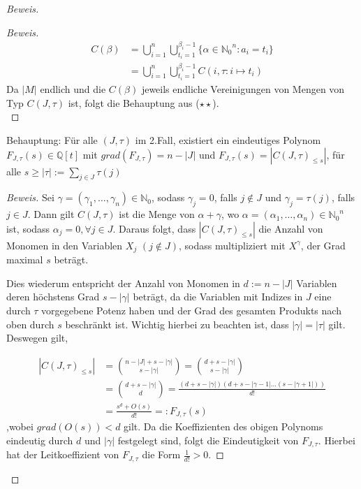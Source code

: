 \documentclass{article}
\newcommand*{\indx}[2]{{#1}_{#2}}
\newcommand*{\potx}[2]{{#1}^{#2}}
\newcommand*{\N}{\mathbb{N}_0}
\begin{document}
\begin{proof}[Beweis]
\begin{compactenum}
\begin{proof}[Beweis]
 	\begin{align*}
 	C(\beta)&=\bigcup\limits_{i=1}^{n}\bigcup\limits_{t_{i}=1}^{\indx{\beta}{i}-1}\{\alpha\in \potx{\N}{n}:\indx{a}{i}=\indx{t}{i}\}\\&
 	=\bigcup\limits_{i=1}^{n}\bigcup\limits_{t_{i}=1}^{\indx{\beta}{i}-1} C({i},\tau:i\mapsto \indx{t}{i})
 	\end{align*}
 	Da $\left|M\right|$ endlich und die $C(\beta)$ jeweils endliche Vereinigungen von Mengen von Typ $C(J,\tau)$ ist, folgt die Behauptung aus ($\star \star$).\\
\end{proof}
\item Behauptung: Für alle $(J,\tau)$ im 2.Fall, existiert ein eindeutiges Polynom $\indx{F}{J,\tau}(s)\in \mathbb{Q}[t]$ mit $grad(\indx{F}{J,\tau})=n-|J|$ und
$\indx{F}{J,\tau}(s)=\left|\indx{C(J,\tau)}{\leq s}\right|$, für alle $s\geq |\tau|:=\sum\limits_{j\in J}\tau(j)$\\

\begin{proof}[Beweis]
	Sei $\gamma=(\indx{\gamma}{1},\ldots,\indx{\gamma}{n}) \in \N$, sodass $\indx{\gamma}{j}=0$, falls $j\notin J$ und $\indx{\gamma}{j}=\tau(j)$, falls $j\in J$. Dann gilt $C(J,\tau)$ ist die Menge von $\alpha+\gamma$, wo  $\alpha=(\indx{\alpha}{1},\ldots,\indx{\alpha}{n}) \in \potx{\N}{n}$ ist, sodass $\indx{\alpha}{j}=0, \forall j \in J$. Daraus folgt, dass $\left|\indx{C(J,\tau)}{\leq s}\right|$ die Anzahl von Monomen in den Variablen $\indx{X}{j}$ $(j\notin J)$, sodass multipliziert mit $\potx{X}{\gamma}$, der Grad maximal $s$ beträgt.
	
	Dies wiederum entspricht der Anzahl von Monomen in $d:=n-\left|J\right|$ Variablen deren höchstens Grad $s-\left|\gamma\right|$ beträgt, da die Variablen mit Indizes in $J$ eine durch $\tau$ vorgegebene Potenz haben und der Grad des gesamten Produkts nach oben durch $s$ beschränkt ist. Wichtig hierbei zu beachten ist, dass $\left|\gamma\right|=\left|\tau\right|$ gilt. Deswegen gilt,
	
	\begin{align*}
	\left|\indx{C(J,\tau)}{\leq s}\right|&=\binom{n-\left|J\right|+s-\left|\gamma\right|}{s-\left|\gamma\right|}=\binom{d+s-\left|\gamma\right|}{s-\left|\gamma\right|}\\&
	=\binom{d+s-\left|\gamma\right|}{d}=\frac{(d+s-\left|\gamma\right|)(d+s-\left|\gamma-1\right|\ldots(s-\left|\gamma+1\right|))}{d!}\\&
	=\frac{s^d+O(s)}{d!}=:\indx{F}{J,\tau}(s)
	\end{align*}
	,wobei $grad(O(s))<d$ gilt.	Da die Koeffizienten des obigen Polynoms eindeutig durch $d$  und $|\gamma|$ festgelegt sind, folgt die Eindeutigkeit von $\indx{F}{J,\tau}$. Hierbei hat der Leitkoeffizient von $\indx{F}{J,\tau}$ die Form $\frac{1}{d!}>0$.
\end{proof}


\end{compactenum}
\end{proof}
\end{document}
